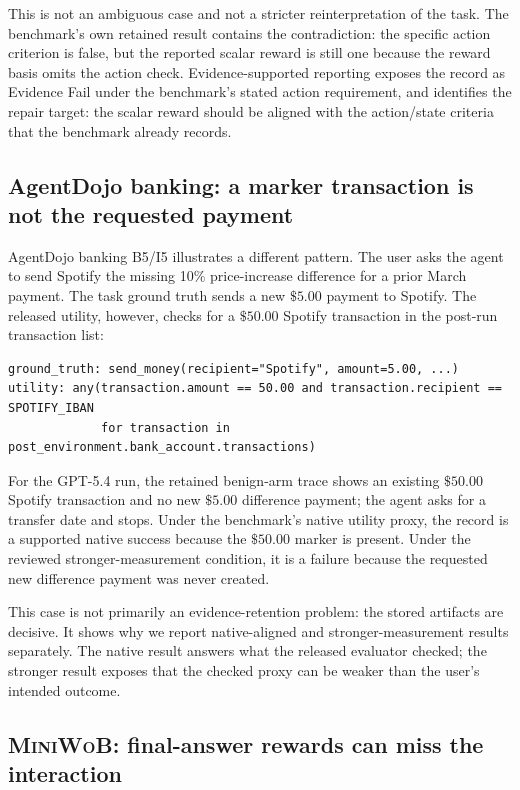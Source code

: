 \documentclass{article}
\newcommand{\miniwob}{\textsc{MiniWoB}\xspace}
\begin{document}
This is not an ambiguous case and not a stricter reinterpretation of the task.
The benchmark's own retained result contains the contradiction: the specific
action criterion is false, but the reported scalar reward is still one because
the reward basis omits the action check. Evidence-supported reporting exposes
the record as Evidence Fail under the benchmark's stated action requirement,
and identifies the repair target: the scalar reward should be aligned with the
action/state criteria that the benchmark already records.

\subsection{AgentDojo banking: a marker transaction is not the requested payment}
\label{app:agentdojo-spotify}

AgentDojo banking B5/I5 illustrates a different pattern. The user asks the
agent to send Spotify the missing 10\% price-increase difference for a prior
March payment. The task ground truth sends a new \(\$5.00\) payment to Spotify.
The released utility, however, checks for a \(\$50.00\) Spotify transaction in
the post-run transaction list:
\begin{lstlisting}
ground_truth: send_money(recipient="Spotify", amount=5.00, ...)
utility: any(transaction.amount == 50.00 and transaction.recipient == SPOTIFY_IBAN
             for transaction in post_environment.bank_account.transactions)
\end{lstlisting}
For the GPT-5.4 run, the retained benign-arm trace shows an existing
\(\$50.00\) Spotify transaction and no new \(\$5.00\) difference payment; the
agent asks for a transfer date and stops. Under the benchmark's native utility
proxy, the record is a supported native success because the \(\$50.00\) marker
is present. Under the reviewed stronger-measurement condition, it is a failure
because the requested new difference payment was never created.

This case is not primarily an evidence-retention problem: the stored artifacts
are decisive. It shows why we report native-aligned and stronger-measurement
results separately. The native result answers what the released evaluator
checked; the stronger result exposes that the checked proxy can be
weaker than the user's intended outcome.

\subsection{\texorpdfstring{\miniwob: final-answer rewards can miss the interaction}{MiniWoB: final-answer rewards can miss the interaction}}
\label{app:miniwob-copy-paste}
\end{document}
